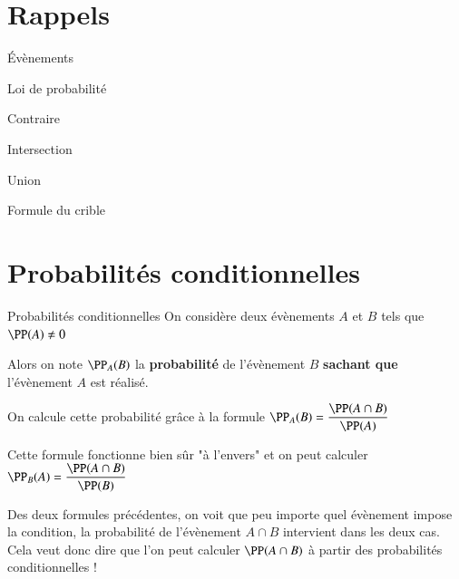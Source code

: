\documentclass[oneside,12pt]{article}          %
\begin{document}
\section{Rappels}

\begin{rappel}{Évènements}
	
\end{rappel}


\begin{rappel}{Loi de probabilité}
	
\end{rappel}

\begin{rappel}{Contraire}

\end{rappel}

\begin{rappel}{Intersection}

\end{rappel}

\begin{rappel}{Union}

\end{rappel}

\begin{propriete}{Formule du crible}

\end{propriete}


\section{Probabilités conditionnelles}

\begin{rappel}{Probabilités conditionnelles}
	On considère deux évènements $A$ et $B$ tels que $\PP(A) \neq 0$
	
	Alors on note $\PP_A(B)$ la \textbf{probabilité} de l'évènement $B$ \textbf{sachant que} l'évènement $A$ est réalisé.
	
	On calcule cette probabilité grâce à la formule $\PP_A(B) = \dfrac{\PP(A \cap B)}{\PP(A)}$
\end{rappel}

\begin{remarque}
	Cette formule fonctionne bien sûr "à l'envers" et on peut calculer $\PP_B(A) = \dfrac{\PP(A \cap B)}{\PP(B)}$
\end{remarque}



Des deux formules précédentes, on voit que peu importe quel évènement impose la condition, la probabilité de l'évènement $A \cap B$ intervient dans les deux cas. Cela veut donc dire que l'on peut calculer $\PP(A \cap B)$ à partir des probabilités conditionnelles !
\end{document}

